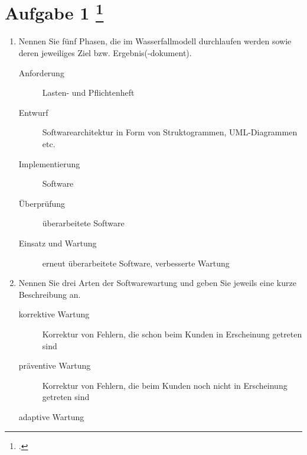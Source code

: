 \documentclass{lehramt-informatik-aufgabe}
\begin{document}
\liAufgabenTitel{}
\section{Aufgabe 1
\footcite{66116:2020:09}}

\begin{enumerate}


\item Nennen Sie fünf Phasen, die im Wasserfallmodell durchlaufen werden
sowie deren jeweiliges Ziel bzw.
Ergebnis(-dokument).

\begin{liAntwort}
\begin{description}
\item[Anforderung]

Lasten- und Pflichtenheft

\item[Entwurf]

Softwarearchitektur in Form von Struktogrammen, UML-Diagrammen etc.

\item[Implementierung]

Software

\item[Überprüfung]

überarbeitete Software

\item[Einsatz und Wartung]

erneut überarbeitete Software, verbesserte Wartung
\end{description}
\end{liAntwort}


\item Nennen Sie drei Arten der Softwarewartung und geben Sie jeweils
eine kurze Beschreibung an.

\begin{liAntwort}
\begin{description}
\item[korrektive Wartung]

Korrektur von Fehlern, die schon beim Kunden in Erscheinung
getreten sind

\item[präventive Wartung]

Korrektur von Fehlern, die beim Kunden
noch nicht in Erscheinung getreten sind

\item[adaptive Wartung]


\end{description}
\end{liAntwort}
\end{enumerate}
\end{document}
